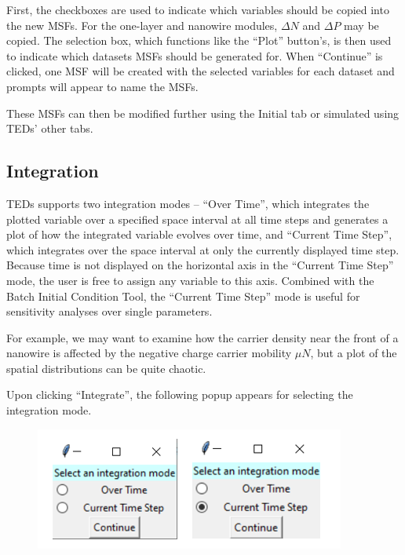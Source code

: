 \documentclass[11pt,letterpaper,titlepage]{article}
\begin{document}
		\par First, the checkboxes are used to indicate which variables should be copied into the new MSFs. For the one-layer and nanowire modules, $\Delta N$ and $\Delta P$ may be copied. The selection box, which functions like the “Plot” button’s, is then used to indicate which datasets MSFs should be generated for. When “Continue” is clicked, one MSF will be created with the selected variables for each dataset and prompts will appear to name the MSFs.
		
		\par These MSFs can then be modified further using the Initial tab or simulated using TEDs’ other tabs.
		
		\subsection {Integration}
		
		\par TEDs supports two integration modes – “Over Time”, which integrates the plotted variable over a specified space interval at all time steps and generates a plot of how the integrated variable evolves over time, and “Current Time Step”, which integrates over the space interval at only the currently displayed time step. Because time is not displayed on the horizontal axis in the “Current Time Step” mode, the user is free to assign any variable to this axis. Combined with the Batch Initial Condition Tool, the “Current Time Step” mode is useful for sensitivity analyses over single parameters.
		
		\par For example, we may want to examine how the carrier density near the front of a nanowire is affected by the negative charge carrier mobility $\mu N$, but a plot of the spatial distributions can be quite chaotic.
		
		\par Upon clicking “Integrate”, the following popup appears for selecting the integration mode.
		
		\begin{figure}[H]
			\label{fig:integration_mode_example}
			\centering
			\includegraphics{"integration_mode_example"}
		\end{figure}
		
\end{document}
